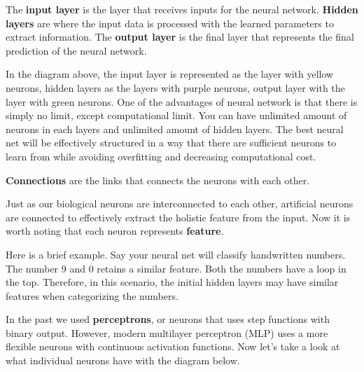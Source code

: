 \documentclass[../../main.tex]{subfiles}
\begin{document}
\begin{definition}{}{}
The \textbf{input layer} is the layer that receives inputs
for the neural network. \textbf{Hidden layers} are where the
input data is processed with the learned parameters to extract
information. The \textbf{output layer} is the final layer that
represents the final prediction of the neural network.
\end{definition}

In the diagram above, the input layer is represented as the
layer with yellow neurons, hidden layers as the layers with
purple neurons, output layer with the layer with green neurons.
One of the advantages of neural network is that there is simply
no limit, except computational limit. You can have unlimited
amount of neurons in each layers and unlimited amount of hidden
layers. The best neural net will be effectively structured in
a way that there are sufficient neurons to learn from while
avoiding overfitting and decreasing computational cost.

\begin{definition}{}{}
\textbf{Connections} are the links that connects the neurons
with each other.
\end{definition}

Just as our biological neurons are interconnected to each other,
artificial neurons are connected to effectively extract the
holistic feature from the input. Now it is worth noting that
each neuron represents \textbf{feature}.

Here is a brief example. Say your neural net will classify
handwritten numbers. The number $9$ and $0$ retains a similar
feature. Both the numbers have a loop in the top. Therefore,
in this scenario, the initial hidden layers may have similar
features when categorizing the numbers.

In the past we used \textbf{perceptrons}, or neurons that uses
step functions with binary output. However, modern multilayer
perceptron (MLP) uses a more flexible neurons with continuous
activation functions. Now let's take a look at what individual
neurons have with the diagram below.
\end{document}
